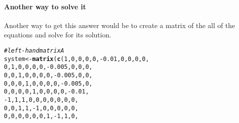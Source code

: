 \documentclass{texMemo}\usepackage[]{graphicx}\usepackage[]{color}
\makeatletter
\newcommand{\hlnum}[1]{\textcolor[rgb]{0.686,0.059,0.569}{#1}}%
\newcommand{\hlcom}[1]{\textcolor[rgb]{0.678,0.584,0.686}{\textit{#1}}}%
\newcommand{\hlopt}[1]{\textcolor[rgb]{0,0,0}{#1}}%
\newcommand{\hlstd}[1]{\textcolor[rgb]{0.345,0.345,0.345}{#1}}%
\newcommand{\hlkwb}[1]{\textcolor[rgb]{0.69,0.353,0.396}{#1}}%
\newcommand{\hlkwd}[1]{\textcolor[rgb]{0.737,0.353,0.396}{\textbf{#1}}}%
\newenvironment{kframe}{%
 \def\at@end@of@kframe{}%
 \ifinner\ifhmode%
  \def\at@end@of@kframe{\end{minipage}}%
  \begin{minipage}{\columnwidth}%
 \fi\fi%
 \def\FrameCommand##1{\hskip\@totalleftmargin \hskip-\fboxsep
 \colorbox{shadecolor}{##1}\hskip-\fboxsep
     \hskip-\linewidth \hskip-\@totalleftmargin \hskip\columnwidth}%
 \MakeFramed {\advance\hsize-\width
   \@totalleftmargin\z@ \linewidth\hsize
   \@setminipage}}%
 {\par\unskip\endMakeFramed%
 \at@end@of@kframe}
\newenvironment{knitrout}{}{} %
\makeatother
\begin{document}
\begin{enumerate}
\begin{center}
\end{center}

\paragraph{Another way to solve it}
Another way to get this answer would be to create a matrix of the all of the
equations and solve for its solution.
\begin{knitrout}\small
{}\color{fgcolor}\begin{kframe}
\begin{alltt}
\hlcom{# left-hand matrix A}
\hlstd{system} \hlkwb{<-} \hlkwd{matrix}\hlstd{(}\hlkwd{c}\hlstd{(}\hlnum{1}\hlstd{,} \hlnum{0}\hlstd{,} \hlnum{0}\hlstd{,} \hlnum{0}\hlstd{,} \hlnum{0}\hlstd{,}\hlopt{-}\hlnum{0.01}\hlstd{,} \hlnum{0}\hlstd{,}     \hlnum{0}\hlstd{,}     \hlnum{0}\hlstd{,}     \hlnum{0}\hlstd{,}
                   \hlnum{0}\hlstd{,} \hlnum{1}\hlstd{,} \hlnum{0}\hlstd{,} \hlnum{0}\hlstd{,} \hlnum{0}\hlstd{,} \hlnum{0}\hlstd{,}   \hlopt{-}\hlnum{0.005}\hlstd{,} \hlnum{0}\hlstd{,}     \hlnum{0}\hlstd{,}     \hlnum{0}\hlstd{,}
                   \hlnum{0}\hlstd{,} \hlnum{0}\hlstd{,} \hlnum{1}\hlstd{,} \hlnum{0}\hlstd{,} \hlnum{0}\hlstd{,} \hlnum{0}\hlstd{,}    \hlnum{0}\hlstd{,}    \hlopt{-}\hlnum{0.005}\hlstd{,} \hlnum{0}\hlstd{,}     \hlnum{0}\hlstd{,}
                   \hlnum{0}\hlstd{,} \hlnum{0}\hlstd{,} \hlnum{0}\hlstd{,} \hlnum{1}\hlstd{,} \hlnum{0}\hlstd{,} \hlnum{0}\hlstd{,}    \hlnum{0}\hlstd{,}     \hlnum{0}\hlstd{,}    \hlopt{-}\hlnum{0.005}\hlstd{,} \hlnum{0}\hlstd{,}
                   \hlnum{0}\hlstd{,} \hlnum{0}\hlstd{,} \hlnum{0}\hlstd{,} \hlnum{0}\hlstd{,} \hlnum{1}\hlstd{,} \hlnum{0}\hlstd{,}    \hlnum{0}\hlstd{,}     \hlnum{0}\hlstd{,}     \hlnum{0}\hlstd{,}    \hlopt{-}\hlnum{0.01}\hlstd{,}
                  \hlopt{-}\hlnum{1}\hlstd{,} \hlnum{1}\hlstd{,} \hlnum{1}\hlstd{,} \hlnum{0}\hlstd{,} \hlnum{0}\hlstd{,} \hlnum{0}\hlstd{,}    \hlnum{0}\hlstd{,}     \hlnum{0}\hlstd{,}     \hlnum{0}\hlstd{,}     \hlnum{0}\hlstd{,}
                   \hlnum{0}\hlstd{,} \hlnum{0}\hlstd{,} \hlnum{1}\hlstd{,} \hlnum{1}\hlstd{,}\hlopt{-}\hlnum{1}\hlstd{,} \hlnum{0}\hlstd{,}    \hlnum{0}\hlstd{,}     \hlnum{0}\hlstd{,}     \hlnum{0}\hlstd{,}     \hlnum{0}\hlstd{,}
                   \hlnum{0}\hlstd{,} \hlnum{0}\hlstd{,} \hlnum{0}\hlstd{,} \hlnum{0}\hlstd{,} \hlnum{0}\hlstd{,} \hlnum{0}\hlstd{,}    \hlnum{1}\hlstd{,}    \hlopt{-}\hlnum{1}\hlstd{,}     \hlnum{1}\hlstd{,}     \hlnum{0}\hlstd{,}

\end{alltt}
\end{kframe}
\end{knitrout}
\end{enumerate}
\end{document}
